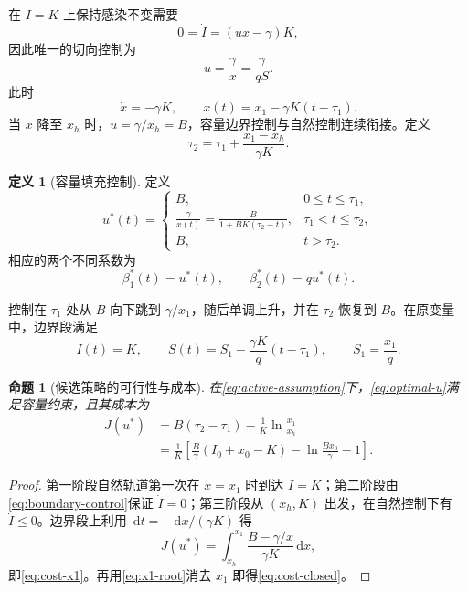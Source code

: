 \documentclass[11pt,a4paper,UTF8]{ctexart}
\newtheorem{proposition}[theorem]{命题}
\theoremstyle{definition}
\newtheorem{definition}[theorem]{定义}
\newcommand{\dd}{\,\mathrm{d}}
\begin{document}
在 $I=K$ 上保持感染不变需要
\[
0=\dot I=(ux-\gamma)K,
\]
因此唯一的切向控制为
\begin{equation}
u=\frac{\gamma}{x}=\frac{\gamma}{qS}.
\label{eq:boundary-control}
\end{equation}
此时
\begin{equation}
\dot x=-\gamma K,
\qquad
x(t)=x_1-\gamma K(t-\tau_1).
\label{eq:linear-boundary-x}
\end{equation}
当 $x$ 降至 $x_h$ 时，$u=\gamma/x_h=B$，容量边界控制与自然控制连续衔接。定义
\begin{equation}
\tau_2=\tau_1+\frac{x_1-x_h}{\gamma K}.
\label{eq:tau2}
\end{equation}

\begin{definition}[容量填充控制]
定义
\begin{equation}
 u^*(t)=
\begin{cases}
B, & 0\le t\le\tau_1,\\[2mm]
\displaystyle\frac{\gamma}{x(t)}
=\frac{B}{1+BK(\tau_2-t)}, & \tau_1<t\le\tau_2,\\[3mm]
B, & t>\tau_2.
\end{cases}
\label{eq:optimal-u}
\end{equation}
相应的两个不同系数为
\begin{equation}
\beta_1^*(t)=u^*(t),\qquad
\beta_2^*(t)=q u^*(t).
\label{eq:optimal-betas}
\end{equation}
\end{definition}

控制在 $\tau_1$ 处从 $B$ 向下跳到 $\gamma/x_1$，随后单调上升，并在 $\tau_2$ 恢复到 $B$。在原变量中，边界段满足
\begin{equation}
I(t)=K,\qquad
S(t)=S_1-\frac{\gamma K}{q}(t-\tau_1),
\qquad S_1=\frac{x_1}{q}.
\label{eq:S-boundary}
\end{equation}

\begin{proposition}[候选策略的可行性与成本]
在\eqref{eq:active-assumption}下，\eqref{eq:optimal-u}满足容量约束，且其成本为
\begin{align}
J(u^*)
&=B(\tau_2-\tau_1)-\frac1K\ln\frac{x_1}{x_h}
\label{eq:cost-x1}\\
&=\frac1K\left[
\frac{B}{\gamma}(I_0+x_0-K)
-\ln\frac{Bx_0}{\gamma}-1
\right].
\label{eq:cost-closed}
\end{align}
\end{proposition}

\begin{proof}
第一阶段自然轨道第一次在 $x=x_1$ 时到达 $I=K$；第二阶段由\eqref{eq:boundary-control}保证 $\dot I=0$；第三阶段从 $(x_h,K)$ 出发，在自然控制下有 $\dot I\le0$。边界段上利用 $\dd t=-\dd x/(\gamma K)$ 得
\[
J(u^*)=\int_{x_h}^{x_1}\frac{B-\gamma/x}{\gamma K}\dd x,
\]
即\eqref{eq:cost-x1}。再用\eqref{eq:x1-root}消去 $x_1$ 即得\eqref{eq:cost-closed}。
\end{proof}
\end{document}
